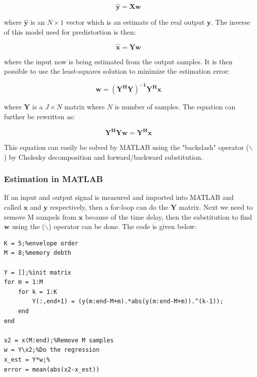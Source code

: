 \begin{equation}
\pmb{\hat{y} = Xw}
\end{equation}  

where $\pmb{\hat{y}}$ is an $N \times 1$ vector which is an estimate of the real output $\pmb{y}$. The inverse of this model used for predistortion is then:

\begin{equation}\label{eq:x_est}
\pmb{\hat{x} = Yw}
\end{equation} 

where the input now is being estimated from the output samples. It is then possible to use the least-squares solution to minimize the estimation error:

\begin{equation}
\pmb{w = (Y^H Y)^{-1} Y^H x}
\end{equation} 

where $\pmb{Y}$ is a $J \times N$ matrix where $N$ is number of samples. The equation can further be rewritten as:

\begin{equation}
\pmb{Y^H Y w = Y^H x}
\end{equation}

This equation can easily be solved by MATLAB using the "backslash" operator ($\backslash$) by Cholesky decomposition and forward/backward substitution.   

\subsubsection{Estimation in MATLAB}
If an input and output signal is measured and imported into MATLAB and called $\pmb{x}$ and $\pmb{y}$ respectively, then a for-loop can do the $\pmb{Y}$ matrix. Next we need to remove M sampels from $\pmb{x}$ because of the time delay, then the substitution to find $\pmb{w}$ using the ($\backslash$) operator can be done.  The code is given below: 

\begin{lstlisting}[frame = single]
K = 5;%envelope order
M = 8;%memory debth

Y = [];%init matrix
for m = 1:M
    for k = 1:K
        Y(:,end+1) = (y(m:end-M+m).*abs(y(m:end-M+m)).^(k-1));
    end
end

x2 = x(M:end);%Remove M samples
w = Y\x2;%Do the regression
x_est = Y*w;%
error = mean(abs(x2-x_est))

\end{lstlisting}

